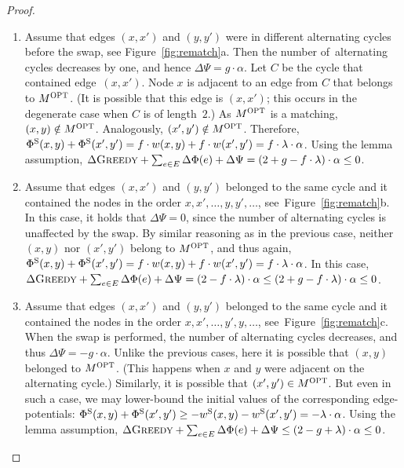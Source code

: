 \begin{proof}
\begin{enumerate}

\item
Assume that edges $(x,x')$ and $(y,y')$ were in different alternating
cycles before the swap, see Figure~\ref{fig:rematch}a. Then the number
of~alternating cycles decreases by one, and hence $\Delta \Psi = g \cdot
\alpha$. Let $C$ be the cycle that contained edge~$(x,x')$. Node $x$ is adjacent
to an edge from $C$ that belongs to $M^\textsc{OPT}$. (It is possible that this edge is
$(x,x')$; this occurs in the degenerate case when $C$ is of length~$2$.) As
$M^\textsc{OPT}$ is a matching, $(x,y) \notin M^\textsc{OPT}$. Analogously, $(x',y') \notin
M^\textsc{OPT}$. Therefore, $\Phi^\textrm{S}(x,y) + \Phi^\textrm{S}(x',y') = f \cdot w(x,y) + f \cdot
w(x',y') = f \cdot \lambda \cdot \alpha$. Using the lemma assumption,
$\Delta \textsc{Greedy} + \sum_{e \in E} \Delta \Phi(e) + \Delta\Psi = (2 + g - f
\cdot \lambda) \cdot \alpha \leq 0$.

\item
Assume that edges $(x,x')$ and $(y,y')$ belonged to the same cycle and
it contained the nodes in the order $x,x',\ldots,y,y',\ldots$,
see~Figure~\ref{fig:rematch}b. In this case, it holds that 
$\Delta \Psi = 0$, since 
the number of alternating cycles is unaffected by the swap. By similar
reasoning as in the previous case, neither $(x,y)$ nor $(x',y')$ belong to
$M^\textsc{OPT}$, and thus again, $\Phi^\textrm{S}(x,y) + \Phi^\textrm{S}(x',y') = f \cdot w(x,y) + f
\cdot w(x',y') = f \cdot \lambda \cdot \alpha$. In this case, $\Delta \textsc{Greedy}
+ \sum_{e \in E} \Delta \Phi(e) + \Delta\Psi = (2 - f \cdot \lambda) \cdot
\alpha \leq (2 + g - f \cdot \lambda) \cdot \alpha \leq 0$.

\item 
Assume that edges $(x,x')$ and $(y,y')$ belonged to the same cycle and
it contained the nodes in the order $x,x',\ldots,y',y,\ldots$,
see~Figure~\ref{fig:rematch}c. When the swap is performed, the number of
alternating cycles decreases, and thus $\Delta \Psi = -g \cdot \alpha$. Unlike
the previous cases, here it is possible that $(x,y)$ belonged to $M^\textsc{OPT}$.
(This happens when $x$ and $y$ were adjacent on the alternating cycle.)
Similarly, it is possible that $(x',y') \in M^\textsc{OPT}$. 
But even in such a case, we may lower-bound the initial values of the
corresponding edge-potentials: $\Phi^\textrm{S}(x,y) + \Phi^\textrm{S}(x',y') \geq -
w^\textrm{S}(x,y) - w^\textrm{S}(x',y') = - \lambda \cdot \alpha$. Using the lemma
assumption, $\Delta \textsc{Greedy} + \sum_{e \in E} \Delta \Phi(e) + \Delta\Psi 
\leq (2 - g + \lambda) \cdot \alpha \leq 0$.
\end{enumerate}

\end{proof}




